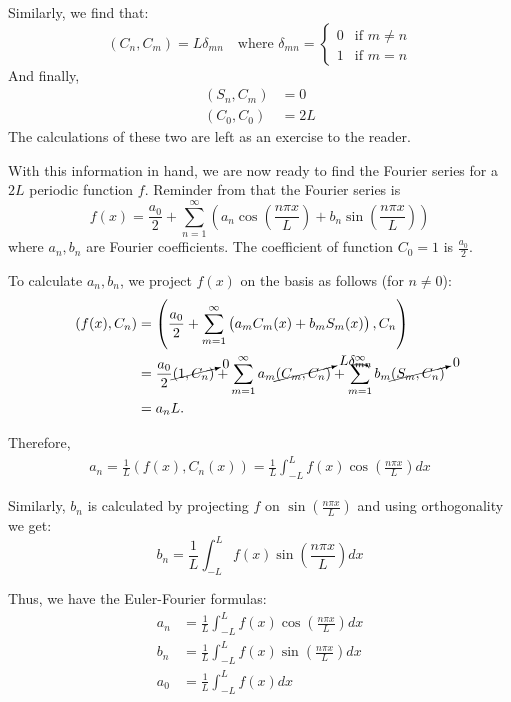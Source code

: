 Similarly, we find that:
\[
(C_n, C_m) = L \delta_{mn} \quad \text{where } \delta_{mn} = \begin{cases}0 & \text{if } m \neq n \\ 1 & \text{if } m = n
\end{cases}
\]
And finally,
\begin{align*}
	(S_n, C_m) &= 0 \\
	(C_0, C_0) &= 2L
\end{align*}
The calculations of these two are left as an exercise to the reader.

With this information in hand, we are now ready to find the Fourier series for a $2L$ periodic function $f$. Reminder from  that the Fourier series is
\[
f(x) = \frac{a_0}{2} + \sum_{n=1}^{\infty} \left(a_n \cos{\left(\frac{n\pi x}{L}\right)} + b_n \sin{\left(\frac{n\pi x}{L}\right)}\right)
\]
where $a_n, b_n$ are Fourier coefficients. The coefficient of function $C_0 = 1$ is $\frac{a_0}{2}$.

To calculate $a_n, b_n$, we project $f(x)$ on the basis as follows (for $n \neq 0$): 
\begin{align*}
	(f(x), C_n) & = \left( \frac{a_0}{2} + \sum_{m=1}^{\infty} \left(a_m C_m(x) + b_m S_m(x) \right), C_n \right) \\
	& = \frac{a_0}{2}\cancelto{0}{(1,C_n)} + \sum_{m=1}^{\infty} a_m\cancelto{L\delta_{mn}}{(C_m, C_n)} + \sum_{m=1}^{\infty} b_m\cancelto{0}{(S_m, C_n)} \\
	&= a_n L.
\end{align*}

Therefore,
\begin{align*}
	a_n = \frac{1}{L} (f(x), C_n(x)) = \frac{1}{L} \int_{-L}^L f(x) \cos{\left(\frac{n \pi x}{L}\right)} dx
\end{align*}

Similarly, $b_n$ is calculated by projecting $f$ on $\sin{\left( \frac{n \pi x}{L} \right)}$ and using orthogonality we get:
\[
b_n = \frac{1}{L} \int_{-L}^L f(x) \sin{\left( \frac{n \pi x}{L} \right)} dx
\]

Thus, we have the Euler-Fourier formulas:
\begin{align}
	\label{eq:eulerfourier1}
	a_n &= \frac{1}{L} \int_{-L}^L f(x) \cos{\left( \frac{n \pi x}{L} \right)} dx \\
	\label{eq:eulerfourier2}
	b_n &= \frac{1}{L} \int_{-L}^L f(x) \sin{\left( \frac{n \pi x}{L} \right)} dx \\
	\label{eq:eulerfourier3}
	a_0 &= \frac{1}{L} \int_{-L}^L f(x) dx
\end{align}

